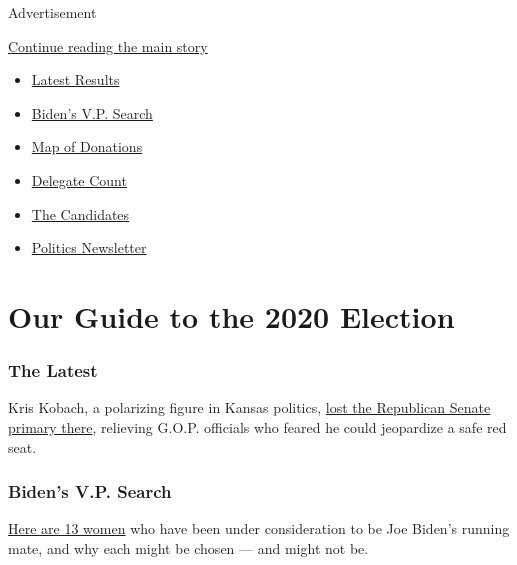 Advertisement

\protect\hyperlink{after-subheader}{Continue reading the main story}

\begin{itemize}
\item
  \href{https://www.nytimes.com/interactive/2020/08/04/us/elections/results-arizona-kansas-michigan-missouri-primaries.html}{Latest
  Results}
\item
  \href{https://www.nytimes.com/article/biden-vice-president-2020.html}{Biden's
  V.P. Search}
\item
  \href{https://www.nytimes.com/interactive/2020/07/24/us/politics/trump-biden-campaign-donors.html}{Map
  of Donations}
\item
  \href{https://www.nytimes.com/interactive/2020/us/elections/delegate-count-primary-results.html}{Delegate
  Count}
\item
  \href{https://www.nytimes.com/interactive/2019/us/politics/2020-presidential-candidates.html}{The
  Candidates}
\item
  \href{https://www.nytimes.com/newsletters/politics}{Politics
  Newsletter}
\end{itemize}

\hypertarget{our-guide-to-the-2020-election}{%
\section{Our Guide to the 2020
Election}\label{our-guide-to-the-2020-election}}

\hypertarget{the-latest}{%
\subsubsection{The Latest}\label{the-latest}}

Kris Kobach, a polarizing figure in Kansas politics,
\href{https://www.nytimes.com/2020/08/04/us/politics/kobach-tlaib.html}{lost
the Republican Senate primary there}, relieving G.O.P. officials who
feared he could jeopardize a safe red seat.

\hypertarget{bidens-vp-search}{%
\subsubsection{Biden's V.P. Search}\label{bidens-vp-search}}

\href{https://www.nytimes.com/article/biden-vice-president-2020.html}{Here
are 13 women} who have been under consideration to be Joe Biden's
running mate, and why each might be chosen --- and might not be.

